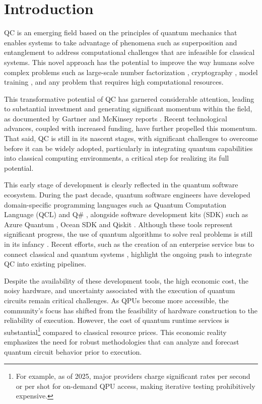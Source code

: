 \documentclass{article}
\begin{document}
\newpage

\section{Introduction}
\label{section:introduction}

QC is an emerging field based on the principles of quantum mechanics \cite{Maslov2019} that enables systems to take advantage of phenomena such as superposition and entanglement to address computational challenges that are infeasible for classical systems. This novel approach has the potential to improve the way humans solve complex problems such as large-scale number factorization \cite{Willsch2023}, cryptography \cite{Upadhyay2019}, model training \cite{Biamonte2017, AdvancesinQuantumDeepLearning}, and any problem that requires high computational resources.

This transformative potential of QC has garnered considerable attention, leading to substantial investment and generating significant momentum within the field, as documented by Gartner and McKinsey reports \cite{McKinsey}. Recent technological advances, coupled with increased funding, have further propelled this momentum. That said, QC is still in its nascent stages, with significant challenges to overcome before it can be widely adopted, particularly in integrating quantum capabilities into classical computing environments, a critical step for realizing its full potential.

This early stage of development is clearly reflected in the quantum software ecosystem. During the past decade, quantum software engineers have developed domain-specific programming languages such as Quantum Computation Language (QCL) \cite{OmerQCLProgramming} and Q\# \cite{MicrosoftQ}, alongside software development kits (SDK) such as Azure Quantum \cite{Bradben2024AzureQuantum}, Ocean SDK \cite{DwaveOceanSdk2024} and Qiskit \cite{IBMQiskit2024}. Although these tools represent significant progress, the use of quantum algorithms to solve real problems is still in its infancy \cite{Ruefenacht2022}. Recent efforts, such as the creation of an enterprise service bus to connect classical and quantum systems \cite{Bonilla2024}, highlight the ongoing push to integrate QC into existing pipelines.

Despite the availability of these development tools, the high economic cost, the noisy hardware, and uncertainty associated with the execution of quantum circuits remain critical challenges. As QPUs become more accessible, the community's focus has shifted from the feasibility of hardware construction to the reliability of execution. However, the cost of quantum runtime services is substantial\footnote{For example, as of 2025, major providers charge significant rates per second or per shot for on-demand QPU access, making iterative testing prohibitively expensive.} compared to classical resource prices. This economic reality emphasizes the need for robust methodologies that can analyze and forecast quantum circuit behavior prior to execution.
\end{document}
